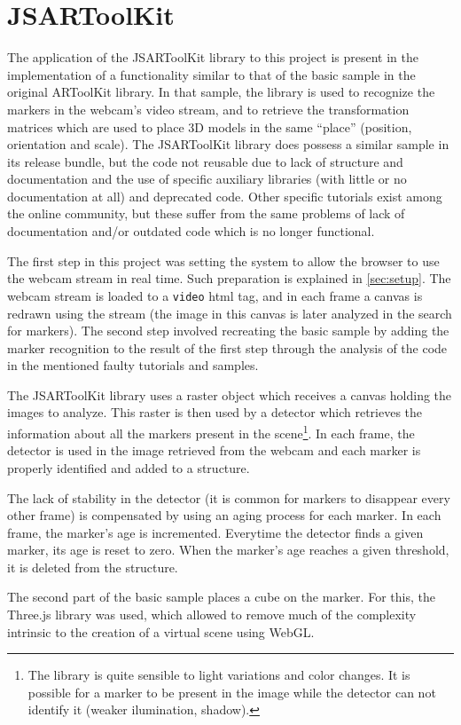 \section{JSARToolKit}
\label{sec:jsartoolkit}

The application of the JSARToolKit library to this project is present in the implementation of a functionality similar to that of the basic sample in the original ARToolKit library. In that sample, the library is used to recognize the markers in the webcam's video stream, and to retrieve the transformation matrices which are used to place 3D models in the same ``place'' (position, orientation and scale). The JSARToolKit library does possess a similar sample in its release bundle, but the code not reusable due to lack of structure and documentation and the use of specific auxiliary libraries (with little or no documentation at all) and deprecated code. Other specific tutorials exist among the online community, but these suffer from the same problems of lack of documentation and/or outdated code which is no longer functional.

The first step in this project was setting the system to allow the browser to use the webcam stream in real time. Such preparation is explained in \cref{sec:setup}. The webcam stream is loaded to a \texttt{video} html tag, and in each frame a canvas is redrawn using the stream (the image in this canvas is later analyzed in the search for markers). The second step involved recreating the basic sample by adding the marker recognition to the result of the first step through the analysis of the code in the mentioned faulty tutorials and samples.


The JSARToolKit library uses a raster object which receives a canvas holding the images to analyze. This raster is then used by a detector which retrieves the information about all the markers present in the scene\footnote{The library is quite sensible to light variations and color changes. It is possible for a marker to be present in the image while the detector can not identify it (weaker ilumination, shadow).}. In each frame, the detector is used in the image retrieved from the webcam and each marker is properly identified and added to a structure.

The lack of stability in the detector (it is common for markers to disappear every other frame) is compensated by using an aging process for each marker. In each frame, the marker's age is incremented. Everytime the detector finds a given marker, its age is reset to zero. When the marker's age reaches a given threshold, it is deleted from the structure.

The second part of the basic sample places a cube on the marker. For this, the Three.js library was used, which allowed to remove much of the complexity intrinsic to the creation of a virtual scene using WebGL.


